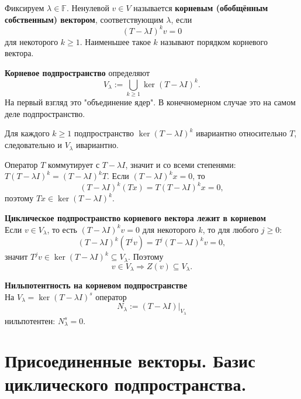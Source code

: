 \documentclass[14pt]{extreport}
\begin{document}
    \begin{defbox}
        Фиксируем $\lambda \in \mathbb{F}$. Ненулевой $v \in V$ называется \textbf{корневым (обобщённым собственным) вектором}, соответствующим $\lambda$, если
        \[
        (T - \lambda I)^k v = 0
        \]
        для некоторого $k \geq 1$. Наименьшее такое $k$ называют порядком корневого вектора.

        \textbf{Корневое подпространство} определяют
        \[
        V_{\lambda} := \bigcup_{k \geq 1} \ker(T - \lambda I)^k.
        \]
        На первый взгляд это "объединение ядер". В конечномерном случае это на самом деле подпространство.
    \end{defbox}

    \begin{thbox}
        Для каждого $k \geq 1$ подпространство $\ker(T - \lambda I)^k$ ивариантно относительно $T$, следовательно и $V_\lambda$ ивариантно.
    \end{thbox}
    \begin{prbox}
        Оператор $T$ коммутирует с $T - \lambda I$, значит и со всеми степенями: $T(T - \lambda I)^k = (T - \lambda I)^kT$. Если $(T - \lambda I)^kx = 0$, то
        \[
        (T - \lambda I)^k (Tx) = T(T - \lambda I)^kx = 0,
        \]
        поэтому $Tx \in \ker(T - \lambda I)^k$.
    \end{prbox}

    \begin{impbox}
        \textbf{Циклическое подпространство корневого вектора лежит в корневом}\\
        Если $v \in V_\lambda$, то есть $(T - \lambda I)^kv = 0$ для некоторого $k$, то для любого $j \geq 0$:
        \[
        (T - \lambda I)^k (T^jv) = T^j (T - \lambda I)^kv = 0,
        \]
        значит $T^jv \in \ker(T - \lambda I)^k \subseteq V_\lambda$. Поэтому
        \[
        v \in V_\lambda \Rightarrow Z(v) \subseteq V_\lambda.
        \]

        \textbf{Нильпотентность на корневом подпространстве}\\
        На $V_\lambda = \ker(T - \lambda I)^s$ оператор
        \[
        N_\lambda := (T - \lambda I) |_{V_\lambda}
        \]
        нильпотентен: $N_\lambda^s=0$.
    \end{impbox}



    \chapter{Присоединенные векторы. Базис циклического подпространства.}
\end{document}
